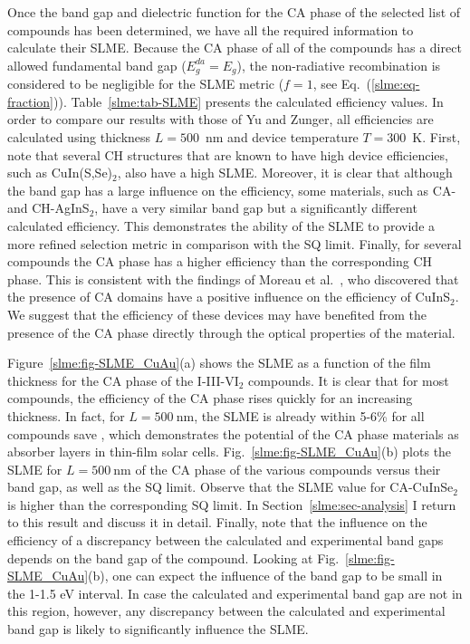 \begin{refsection}
Once the band gap and dielectric function for the \gls{CA} phase of 
the selected list of compounds has been determined, we have all the required information to 
calculate their \gls{SLME}. Because the \gls{CA} phase of all of the compounds has a direct 
allowed fundamental band gap ($E_g^{da}=E_g$), the non-radiative recombination 
is considered to be negligible for the \gls{SLME} metric ($f = 1$, see 
Eq.~(\ref{slme:eq-fraction})). Table~\ref{slme:tab-SLME} presents the 
calculated efficiency values.
In order to compare our results with those of Yu 
and Zunger, all efficiencies are calculated using thickness $L = 
500$~\si{\nano\meter} and device temperature \mbox{$T = 300$~\si{\kelvin}}. 
First, note that several \gls{CH} structures that are known to have high device 
efficiencies, such as CuIn(S,Se)$_{2}$, also have a high \gls{SLME}. Moreover, it is 
clear that although the band gap has a large influence on the efficiency, some 
materials, such as \gls{CA}- and \mbox{CH-AgInS$_2$}, have a very similar band gap 
but a significantly different calculated efficiency. This demonstrates the 
ability of the \gls{SLME} to provide a more refined selection metric in comparison 
with the \gls{SQ} limit. Finally, for several compounds the \gls{CA} phase 
has a higher efficiency than the corresponding \gls{CH} phase. This is consistent 
with the findings of Moreau et al.~\cite{Moreau2015}, who discovered that the 
presence of \gls{CA} domains have a positive influence on the efficiency of 
CuInS$_2$. We suggest that the efficiency of these devices may have benefited 
from the presence of the \gls{CA} phase directly through the optical properties of 
the material. 

Figure~\ref{slme:fig-SLME_CuAu}(a) shows the \gls{SLME} as a function of the film thickness for the \gls{CA} phase of the I-III-VI$_2$ compounds. It is clear that for most 
compounds, the efficiency of the \gls{CA} phase rises quickly for an increasing 
thickness. In fact, for $L=500~\si{\nano\meter}$, the \gls{SLME} is already within 5-6\% for all compounds save , which demonstrates the potential of the \gls{CA} phase materials as 
absorber layers in thin-film solar cells. Fig.~\ref{slme:fig-SLME_CuAu}(b) plots the \gls{SLME} for $L=500~\si{\nano\meter}$ of the \gls{CA} phase of the various 
compounds versus their band gap, as well as the \gls{SQ} limit. Observe 
that the \gls{SLME} value for \mbox{CA-CuInSe$_2$} is higher than the 
corresponding \gls{SQ} limit. In Section~\ref{slme:sec-analysis} I return to this 
result and discuss it in detail. Finally, note that the influence on the efficiency of a 
discrepancy between the calculated and experimental band gaps depends on the band 
gap of the compound.
Looking at Fig.~\ref{slme:fig-SLME_CuAu}(b), one can expect the 
influence of the band gap to be small in the 1-1.5 \si{\electronvolt} 
interval. In case the calculated and experimental band gap are not in this 
region, however, any discrepancy between the calculated and experimental band 
gap is likely to significantly influence the \gls{SLME}. 


\end{refsection}
